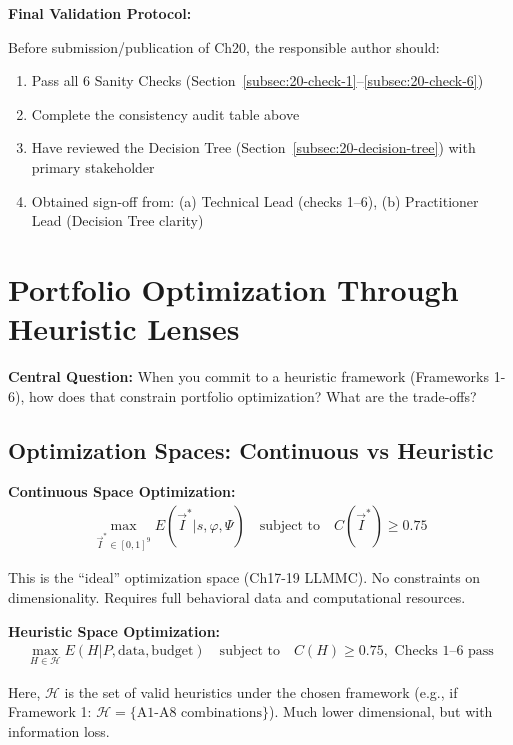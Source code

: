 \textbf{Final Validation Protocol:}

Before submission/publication of Ch20, the responsible author should:

\begin{enumerate}
\item Pass all 6 Sanity Checks (Section~\ref{subsec:20-check-1}--\ref{subsec:20-check-6})
\item Complete the consistency audit table above
\item Have reviewed the Decision Tree (Section~\ref{subsec:20-decision-tree}) with primary stakeholder
\item Obtained sign-off from: (a) Technical Lead (checks 1--6), (b) Practitioner Lead (Decision Tree clarity)
\end{enumerate}

\section{Portfolio Optimization Through Heuristic Lenses}
\label{sec:20-heuristic-optimization}

\textbf{Central Question:} When you commit to a heuristic framework (Frameworks 1-6), how does that constrain portfolio optimization? What are the trade-offs?

\subsection{Optimization Spaces: Continuous vs Heuristic}

\begin{definition}

\textbf{Continuous Space Optimization:}
\begin{align}
\max_{\vec{I}^* \in [0,1]^9} E(\vec{I}^* | s, \varphi, \Psi) \quad \text{subject to} \quad C(\vec{I}^*) \geq 0.75
\end{align}

This is the ``ideal'' optimization space (Ch17-19 LLMMC). No constraints on dimensionality. Requires full behavioral data and computational resources.

\textbf{Heuristic Space Optimization:}
\begin{align}
\max_{H \in \mathcal{H}} E(H | P, \text{data}, \text{budget}) \quad \text{subject to} \quad C(H) \geq 0.75, \text{ Checks 1--6 pass}
\end{align}

Here, $\mathcal{H}$ is the set of valid heuristics under the chosen framework (e.g., if Framework 1: $\mathcal{H} = \{\text{A1-A8 combinations}\}$). Much lower dimensional, but with information loss.

\end{definition}

